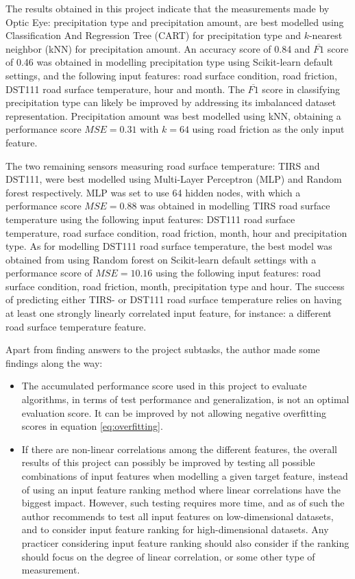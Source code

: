 	The results obtained in this project indicate that the measurements made by Optic Eye: precipitation type and precipitation amount, are best modelled using Classification And Regression Tree (CART) for precipitation type and $k$-nearest neighbor (kNN) for precipitation amount. An accuracy score of 0.84 and $\overline{F1}$ score of 0.46 was obtained in modelling precipitation type using Scikit-learn default settings, and the following input features: road surface condition, road friction, DST111 road surface temperature, hour and month. 	The $\overline{F1}$ score in classifying precipitation type can likely be improved by addressing its imbalanced dataset representation. Precipitation amount was best modelled using kNN, obtaining a performance score $MSE=0.31$ with $k=64$ using road friction as the only input feature. 

	The two remaining sensors measuring road surface temperature: TIRS and DST111, were best modelled using Multi-Layer Perceptron (MLP) and Random forest respectively. MLP was set to use 64 hidden nodes, with which a performance score $MSE=0.88$ was obtained in modelling TIRS road surface temperature using the following input features: DST111 road surface temperature, road surface condition, road friction, month, hour and precipitation type. As for modelling DST111 road surface temperature, the best model was obtained from using Random forest on Scikit-learn default settings with a performance score of $MSE=10.16$ using the following input features: road surface condition, road friction, month, precipitation type and hour. The success of predicting either TIRS- or DST111 road surface temperature relies on having at least one strongly linearly correlated input feature, for instance: a different road surface temperature feature. 

	Apart from finding answers to the project subtasks, the author made some findings along the way:

	\begin{itemize}
		\item The accumulated performance score used in this project to evaluate algorithms, in terms of test performance and generalization, is not an optimal evaluation score. It can be improved by not allowing negative overfitting scores in equation \ref{eq:overfitting}. 
		\item If there are non-linear correlations among the different features, the overall results of this project can possibly be improved by testing all possible combinations of input features when modelling a given target feature, instead of using an input feature ranking method where linear correlations have the biggest impact. However, such testing requires more time, and as of such the author recommends to test all input features on low-dimensional datasets, and to consider input feature ranking for high-dimensional datasets. Any practicer considering input feature ranking should also consider if the ranking should focus on the degree of linear correlation, or some other type of measurement.
	\end{itemize}


